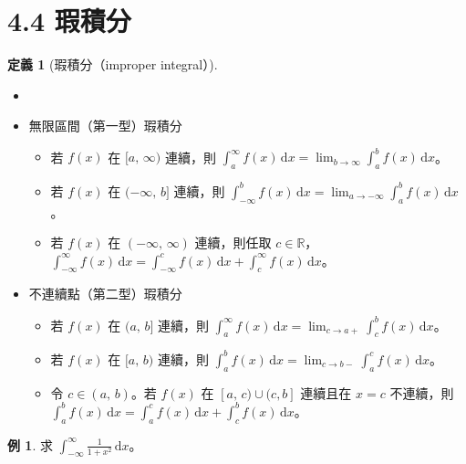 \documentclass[12pt]{extarticle}
\newcommand{\ds}{\displaystyle}
\theoremstyle{definition}
\newtheorem*{dfn}{定義}
\newtheorem*{ex}{例}
\newcommand{\myline}{\noindent\makebox[\linewidth]{\rule{\paperwidth}{0.4pt}}}
\begin{document}
\myline

\section*{4.4 瑕積分}

\begin{dfn}[瑕積分（improper integral）]
  \begin{itemize}\setlength{\itemsep}{0pt}
    \item[]
    \item 無限區間（第一型）瑕積分
      \begin{itemize}\setlength{\itemsep}{-1pt}
        \item 若 $f(x)$ 在 $\ds[a,\,\infty)$ 連續，則 $\ds\int_a^\infty f(x)\,\text{d}x = \lim_{b\to\infty}\int_a^b f(x)\,\text{d}x$。
        \item 若 $f(x)$ 在 $\ds(-\infty,\,b]$ 連續，則 $\ds\int_{-\infty}^b f(x)\,\text{d}x = \lim_{a\to-\infty}\int_a^b f(x)\,\text{d}x$。
        \item 若 $f(x)$ 在 $\ds(-\infty,\,\infty)$ 連續，則任取 $c\in\mathbb{R}$，$\ds\int_{-\infty}^\infty f(x)\,\text{d}x = \int_{-\infty}^c f(x)\,\text{d}x + \int_c^{\infty} f(x)\,\text{d}x$。
      \end{itemize}
    \item 不連續點（第二型）瑕積分
      \begin{itemize}\setlength{\itemsep}{-1pt}
        \item 若 $f(x)$ 在 $\ds(a,\,b]$ 連續，則 $\ds\int_a^\infty f(x)\,\text{d}x = \lim_{c\to a+}\int_c^b f(x)\,\text{d}x$。
        \item 若 $f(x)$ 在 $\ds[a,\,b)$ 連續，則 $\ds\int_a^b f(x)\,\text{d}x = \lim_{c\to b-}\int_a^c f(x)\,\text{d}x$。
        \item 令 $\ds c\in(a,\,b)$。若 $f(x)$ 在 $\ds[a,\,c)\cup(c, b]$ 連續且在 $x = c$ 不連續，則 $\ds\int_a^b f(x)\,\text{d}x = \int_{a}^c f(x)\,\text{d}x + \int_c^{b} f(x)\,\text{d}x$。
      \end{itemize}
  \end{itemize}
\end{dfn}

\begin{ex}
  求 $\ds\int_{-\infty}^{\infty}\!\frac{1}{1 + x^2}\,\mathrm{d}x$。
\end{ex}
\end{document}
